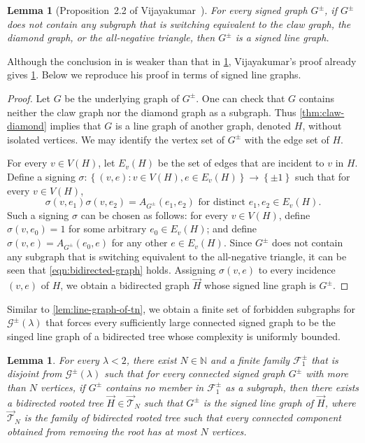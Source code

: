 \documentclass[11pt]{article}
\newtheorem{lemma}[theorem]{Lemma}
\theoremstyle{definition}
\theoremstyle{remark}
\newcommand{\dset}[2]{\left\{{#1}\colon{#2}\right\}}
\newcommand{\sset}[1]{\left\{{#1}\right\}}
\newcommand{\la}{\lambda}
\newcommand{\F}{\mathcal{F}}
\newcommand{\G}{\mathcal{G}}
\newcommand{\N}{\mathbb{N}}
\newcommand{\Gs}{\G^\pm(\la)}
\begin{document}
\begin{lemma}[Proposition~2.2 of Vijayakumar~\cite{V87}] \label{lem:claw-diamond-signed}
    For every signed graph $G^\pm$, if $G^\pm$ does not contain any subgraph that is switching equivalent to the claw graph, the diamond graph, or the all-negative triangle, then $G^\pm$ is a signed line graph.
\end{lemma}

Although the conclusion in \cite[Proposition~2.2]{V87} is weaker than that in \cref{lem:claw-diamond-signed}, Vijayakumar's proof already gives \cref{lem:claw-diamond-signed}. Below we reproduce his proof in terms of signed line graphs.

\begin{proof}
    Let $G$ be the underlying graph of $G^\pm$. One can check that $G$ contains neither the claw graph nor the diamond graph as a subgraph. Thus \cref{thm:claw-diamond} implies that $G$ is a line graph of another graph, denoted $H$, without isolated vertices. We may identify the vertex set of $G^\pm$ with the edge set of $H$.
    
    For every $v \in V(H)$, let $E_v(H)$ be the set of edges that are incident to $v$ in $H$. Define a signing $\sigma \colon \dset{(v, e)}{v \in V(H), e \in E_v(H)} \to \sset{\pm1}$ such that for every $v \in V(H)$,
    \begin{equation} \label{eqn:bidirected-graph}
        \sigma(v, e_1)\sigma(v, e_2) = A_{G^\pm}(e_1,e_2) \text{ for distinct } e_1, e_2 \in E_v(H).
    \end{equation}
    Such a signing $\sigma$ can be chosen as follows: for every $v\in V(H)$, define $\sigma(v, e_0) = 1$ for some arbitrary $e_0 \in E_v(H)$; and define $\sigma(v, e) = A_{G^\pm}(e_0, e)$ for any other $e \in E_v(H)$. Since $G^\pm$ does not contain any subgraph that is switching equivalent to the all-negative triangle, it can be seen that \eqref{eqn:bidirected-graph} holds. Assigning $\sigma(v, e)$ to every incidence $(v, e)$ of $H$, we obtain a bidirected graph $\vec{H}$ whose signed line graph is $G^\pm$.
\end{proof}

Similar to \cref{lem:line-graph-of-tn}, we obtain a finite set of forbidden subgraphs for $\Gs$ that forces every sufficiently large connected signed graph to be the singed line graph of a bidirected tree whose complexity is uniformly bounded.

\begin{lemma} \label{lem:main2-claim}
    For every $\la < 2$, there exist $N \in \N$ and a finite family $\F_1^\pm$ that is disjoint from $\Gs$ such that for every connected signed graph $G^\pm$ with more than $N$ vertices, if $G^\pm$ contains no member in $\F_1^\pm$ as a subgraph, then there exists a bidirected rooted tree $\vec{H} \in \vec{\mathcal{T}}_N$ such that $G^\pm$ is the signed line graph of $\vec{H}$, where $\vec{\mathcal{T}}_N$ is the family of bidirected rooted tree such that every connected component obtained from removing the root has at most $N$ vertices.
\end{lemma}
\end{document}
